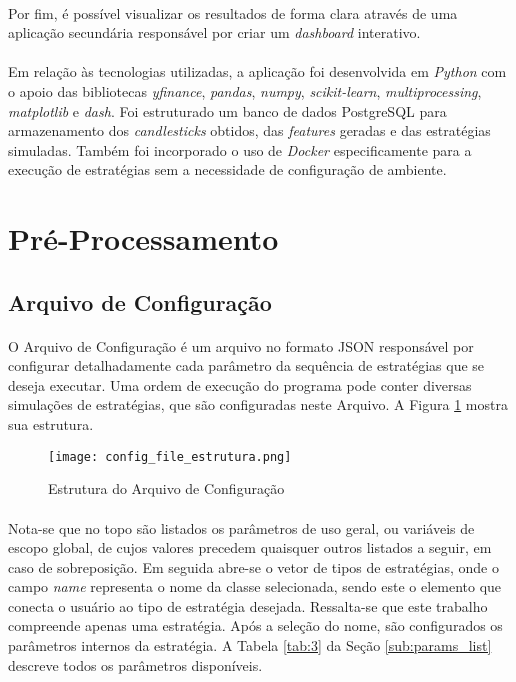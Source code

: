 \paragraph{} Por fim, é possível visualizar os resultados de forma clara através de uma aplicação secundária responsável por criar um \textit{dashboard} interativo.

\paragraph{} Em relação às tecnologias utilizadas, a aplicação foi desenvolvida em \textit{Python} com o apoio das bibliotecas \textit{yfinance}, \textit{pandas}, \textit{numpy}, \textit{scikit-learn}, \textit{multiprocessing}, \textit{matplotlib} e \textit{dash}. Foi estruturado um banco de dados PostgreSQL para armazenamento dos \textit{candlesticks} obtidos, das \textit{features} geradas e das estratégias simuladas. Também foi incorporado o uso de \textit{Docker} especificamente para a execução de estratégias sem a necessidade de configuração de ambiente.



\FloatBarrier
\section{Pré-Processamento}

\FloatBarrier
\subsection{Arquivo de Configuração}
\label{sub:conf_file}

\paragraph{} O Arquivo de Configuração é um arquivo no formato JSON responsável por configurar detalhadamente cada parâmetro da sequência de estratégias que se deseja executar. Uma ordem de execução do programa pode conter diversas simulações de estratégias, que são configuradas neste Arquivo. A Figura \ref{fig:101} mostra sua estrutura.

\begin{figure}[!htb]
    \texttt{[image: config\_file\_estrutura.png]}
    \centering
    \caption{Estrutura do Arquivo de Configuração}
    \label{fig:101}
\end{figure}

\paragraph{} Nota-se que no topo são listados os parâmetros de uso geral, ou variáveis de escopo global, de cujos valores precedem quaisquer outros listados a seguir, em caso de sobreposição. Em seguida abre-se o vetor de tipos de estratégias, onde o campo \textit{name} representa o nome da classe selecionada, sendo este o elemento que conecta o usuário ao tipo de estratégia desejada. Ressalta-se que este trabalho compreende apenas uma estratégia. Após a seleção do nome, são configurados os parâmetros internos da estratégia. A Tabela \ref{tab:3} da Seção \ref{sub:params_list} descreve todos os parâmetros disponíveis.

